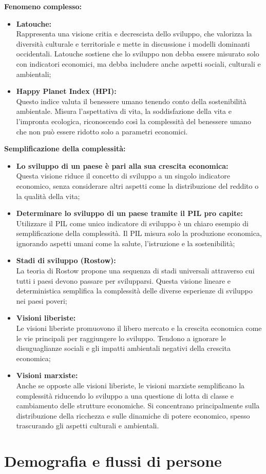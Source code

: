 \documentclass{article}
\begin{document}
\textbf{\large Fenomeno complesso:}
\begin{itemize}
    \item \textbf{Latouche:}\\
        Rappresenta una visione critia e decrescista dello sviluppo, che valorizza la diversità
        culturale e territoriale e mette in discussione i modelli dominanti occidentali.
        Latouche sostiene che lo sviluppo non debba essere misurato solo con indicatori
        economici, ma debba includere anche aspetti sociali, culturali e ambientali;
    \item \textbf{Happy Planet Index (HPI):}\\
        Questo indice valuta il benessere umano tenendo conto della sostenibilità ambientale.
        Misura l'aspettativa di vita, la soddisfazione della vita e l'impronta ecologica,
        riconoscendo così la complessità del benessere umano che non può essere ridotto solo
        a parametri economici.
\end{itemize}

\textbf{\large Semplificazione della complessità:}
\begin{itemize}
    \item \textbf{Lo sviluppo di un paese è pari alla sua crescita economica:}\\
        Questa visione riduce il concetto di sviluppo a un singolo indicatore economico,
        senza considerare altri aspetti come la distribuzione del reddito o la qualità della
        vita;
    \item \textbf{Determinare lo sviluppo di un paese tramite il PIL pro capite:}\\
        Utilizzare il PIL come unico indicatore di sviluppo è un chiaro esempio di
        semplificazione della complessità. Il PIL misura solo la produzione economica,
        ignorando aspetti umani come la salute, l'istruzione e la sostenibilità;
    \item \textbf{Stadi di sviluppo (Rostow):}\\
        La teoria di Rostow propone una sequenza di stadi universali attraverso cui tutti i
        paesi devono passare per svilupparsi. Questa visione lineare e deterministica
        semplifica la complessità delle diverse esperienze di sviluppo nei paesi poveri;
    \item \textbf{Visioni liberiste:}\\
        Le visioni liberiste promuovono il libero mercato e la crescita economica come le vie
        principali per raggiungere lo sviluppo. Tendono a ignorare le disuguaglianze sociali e
        gli impatti ambientali negativi della crescita economica;
    \item \textbf{Visioni marxiste:}\\
        Anche se opposte alle visioni liberiste, le visioni marxiste semplificano la
        complessità riducendo lo sviluppo a una questione di lotta di classe e cambiamento
        delle strutture economiche. Si concentrano principalmente sulla distribuzione della
        ricchezza e sulle dinamiche di potere economico, spesso trascurando gli aspetti 
        culturali e ambientali.
\end{itemize}
\pagebreak

\section{Demografia e flussi di persone}
\end{document}
